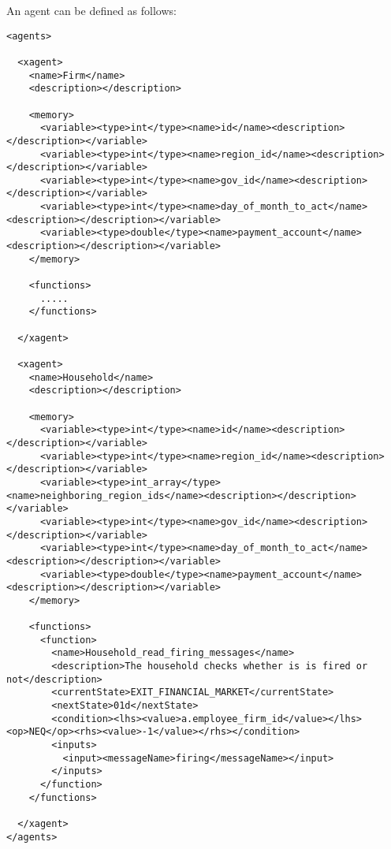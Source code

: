 An agent can be defined as follows:
\begin{mylisting}
\begin{verbatim}
<agents>

  <xagent>
    <name>Firm</name>
    <description></description>

    <memory>
      <variable><type>int</type><name>id</name><description></description></variable>
      <variable><type>int</type><name>region_id</name><description></description></variable>
      <variable><type>int</type><name>gov_id</name><description></description></variable>
      <variable><type>int</type><name>day_of_month_to_act</name><description></description></variable>
      <variable><type>double</type><name>payment_account</name><description></description></variable>
    </memory>

    <functions>
      .....
    </functions>

  </xagent>

  <xagent>
    <name>Household</name>
    <description></description>

    <memory>
      <variable><type>int</type><name>id</name><description></description></variable>
      <variable><type>int</type><name>region_id</name><description></description></variable>
      <variable><type>int_array</type><name>neighboring_region_ids</name><description></description></variable>
      <variable><type>int</type><name>gov_id</name><description></description></variable>
      <variable><type>int</type><name>day_of_month_to_act</name><description></description></variable>
      <variable><type>double</type><name>payment_account</name><description></description></variable>
    </memory>

    <functions>
      <function>
        <name>Household_read_firing_messages</name>
        <description>The household checks whether is is fired or not</description>
        <currentState>EXIT_FINANCIAL_MARKET</currentState>
        <nextState>01d</nextState>
        <condition><lhs><value>a.employee_firm_id</value></lhs><op>NEQ</op><rhs><value>-1</value></rhs></condition>
        <inputs>
          <input><messageName>firing</messageName></input>
        </inputs>
      </function>
    </functions>

  </xagent>
</agents>
\end{verbatim}
\end{mylisting}

